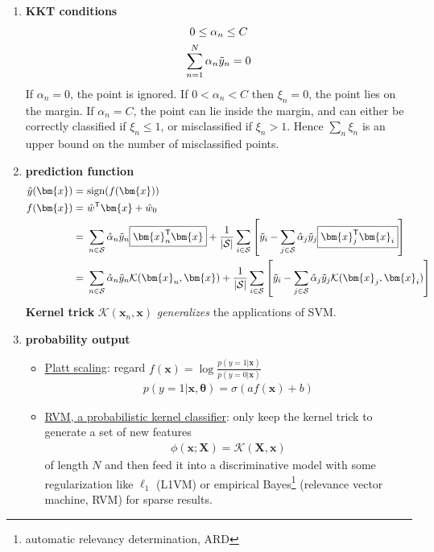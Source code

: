 \begin{enumerate}[(1)]
        \item \textbf{KKT conditions}
        \begin{gather}
            0 \leq \alpha_n \leq C \\
            \sum_{n=1}^N\alpha_n\Tilde{y}_n = 0
        \end{gather}
        If $\alpha_n=0$, the point is ignored. 
        If $0 < \alpha_n < C$ then $\xi_n=0$, 
        the point lies on the margin. 
        If $\alpha_n = C$, the point can lie inside the margin, 
        and can either be correctly classified if $\xi_n \leq 1$, or misclassified if $\xi_n > 1$. 
        Hence $\sum_{n}\xi_n$ is an upper bound on the number of misclassified points.
        \item \textbf{prediction function}
        \begin{align}
            \hat{y}(\bm{x}) =&~ \mathrm{sign}(f(\bm{x})) \\
            f(\bm{x}) 
            =&~ \hat{w}^\mathsf{T}\bm{x} + \hat{w}_0 \\
            =&~ \sum_{n\in\mathcal{S}}\hat{\alpha}_n\Tilde{y}_n\boxed{\bm{x}_n^\mathsf{T}\bm{x}} 
            + \frac{1}{|\mathcal{S}|}\sum_{i\in\mathcal{S}}\left[
                \Tilde{y}_i - \sum_{j\in\mathcal{S}}\hat{\alpha}_j\Tilde{y}_j\boxed{\bm{x}_j^\mathsf{T}\bm{x}_i}
            \right] \\
            =&~ \sum_{n\in\mathcal{S}}\hat{\alpha}_n\Tilde{y}_n\mathcal{K}(\bm{x}_n,\bm{x}) 
            + \frac{1}{|\mathcal{S}|}\sum_{i\in\mathcal{S}}\left[
                \Tilde{y}_i - \sum_{j\in\mathcal{S}}\hat{\alpha}_j\Tilde{y}_j\mathcal{K}(\bm{x}_j,\bm{x}_i)
            \right]
        \end{align}
        \textbf{Kernel trick} $\mathcal{K}(\bm{x}_n,\bm{x})$ \textit{generalizes} the applications of SVM.
        \item \textbf{probability output}
        \begin{itemize}
            \item \uline{Platt scaling}: regard $f(\bm{x})=\log\frac{p(y=1|\bm{x})}{p(y=0|\bm{x})}$
            \begin{gather}
                p(y=1|\bm{x},\bm{\theta}) = \sigma(af(\bm{x})+b)
            \end{gather}
            \item \uline{RVM, a probabilistic kernel classifier}: 
            only keep the kernel trick to generate a set of new features
            \begin{gather}
                \phi(\bm{x};\mathbf{X})=\mathcal{K}(\mathbf{X},\bm{x})
            \end{gather}
            of length $N$ and 
            then feed it into a discriminative model with some regularization like $\ell_1$ (L1VM) or empirical Bayes\footnote{automatic relevancy determination, ARD} (relevance vector machine, RVM) for sparse results.
        \end{itemize}
    \end{enumerate}
